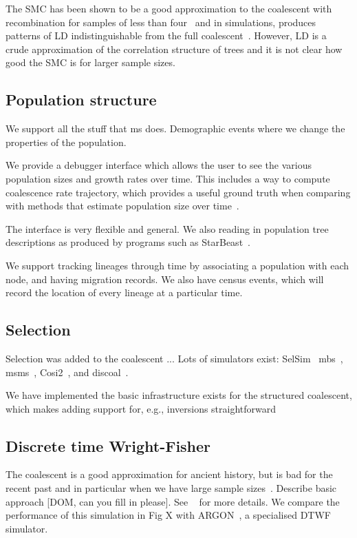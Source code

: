 \documentclass{article}
\begin{document}
The SMC has been shown to be a good approximation to the
coalescent with recombination for samples of less than
four~\citep{hobolth2014markovian,wilton2015smc}
and in simulations, produces patterns of LD indistinguishable from the
full coalescent~\citep{mcvean2005approximating,marjoram2006fast}. However,
LD is a crude approximation of the correlation structure of trees
and it is not clear how good the SMC is for larger sample sizes.


\subsection*{Population structure}
We support all the stuff that ms does.
Demographic events where we change
the properties of the population.

We provide a debugger interface which allows the user to see the
various population sizes and growth rates over time. This includes
a way to compute coalescence rate trajectory, which provides a useful
ground truth when comparing with methods that estimate population
size over time~\citep{adrion2019community}.

The interface
is very flexible and general. We also reading in population tree
descriptions as produced by programs such as
StarBeast~\citep{heled2009bayesian}.

We support tracking lineages through time by associating a population
with each node, and having migration records. We also have
census events, which will record the location of every lineage
at a particular time.

\subsection*{Selection}
Selection was added to the coalescent ... Lots of simulators exist:
SelSim~\citep{spencer2004selsim}
mbs~\citep{teshima2009mbs},
msms~\citep{ewing2010msms},
Cosi2~\citep{shlyakhter2014cosi2},
and discoal~\citep{kern2016discoal}.

We have implemented the basic infrastructure exists for the structured
coalescent, which makes adding support for, e.g.,
inversions straightforward~\citep{peischl2013sequential}


\subsection*{Discrete time Wright-Fisher}
The coalescent is a good approximation for ancient history, but
is bad for the recent past and in particular when we have large
sample
sizes~\citep{wakeley2012gene,bhaskar2014distortion,nelson2020accounting}.
Describe basic
approach [DOM, can you fill in please].
See ~\cite{nelson2020accounting} for more details.
We compare the performance of this simulation in Fig X
with ARGON~\citep{palamara2016argon}, a specialised DTWF simulator.
\end{document}
